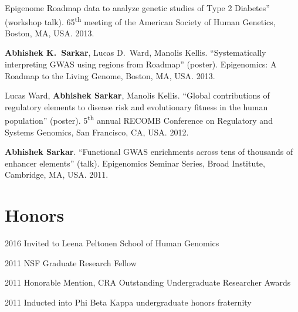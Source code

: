 \documentclass{article}
\begin{document}
\begin{henum}
  Epigenome Roadmap data to analyze genetic studies of Type 2 Diabetes''
  (workshop talk). 65\textsuperscript{th} meeting of the American Society of
  Human Genetics, Boston, MA, USA. 2013.
\item \textbf{Abhishek K.\ Sarkar}, Lucas D.\ Ward, Manolis
  Kellis. ``Systematically interpreting GWAS using regions from Roadmap''
  (poster). Epigenomics: A Roadmap to the Living Genome, Boston, MA, USA. 2013.
\item Lucas Ward, \textbf{Abhishek Sarkar}, Manolis Kellis. ``Global
  contributions of regulatory elements to disease risk and evolutionary fitness
  in the human population'' (poster). 5\textsuperscript{th} annual RECOMB
  Conference on Regulatory and Systems Genomics, San Francisco, CA, USA. 2012.
\item \textbf{Abhishek Sarkar}. ``Functional GWAS enrichments across tens of
  thousands of enhancer elements'' (talk). Epigenomics Seminar Series, Broad
  Institute, Cambridge, MA, USA. 2011.
\end{henum}

\section*{Honors}
\begin{hdesc}
\item[2016] Invited to Leena Peltonen School of Human Genomics
\item[2011] NSF Graduate Research Fellow
\item[2011] Honorable Mention, CRA Outstanding Undergraduate Researcher Awards
\item[2011] Inducted into Phi Beta Kappa undergraduate honors fraternity
\end{hdesc}
\end{document}
